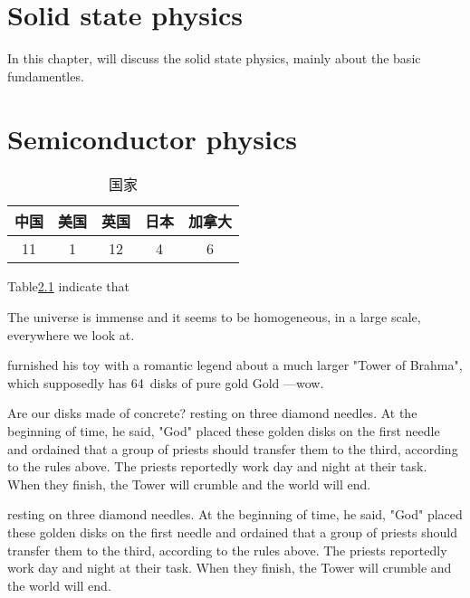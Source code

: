 \chapter{Solid state physics}
\label{Solid state physics}
In this chapter, will discuss the solid state physics, mainly about the basic fundamentles.


\chapter{Semiconductor physics}
\label{Semiconductor physics}

	\begin{table}[H]
		\centering
		\caption{国家}
		\begin{tabular}{|c|c|c|c|c|}
			\hline
			中国 &美国 &英国 &日本&加拿大\\
			\hline
			11&1&12&4&6\\
			\hline
		\end{tabular}
		\label{tab2}    
	\end{table}
	
	Table\ref{tab2} indicate that
	
	The universe is immense and it seems to be homogeneous, 
	in a large scale, everywhere we look at.
	
	furnished his toy with a romantic legend about a much larger
	"Tower of Brahma", which supposedly has 64~disks of pure gold
	Gold ---wow.\par Are our disks made of concrete? 
	resting on three diamond needles. At the beginning of time, he said,
	"God" placed these golden disks on the first needle and ordained that a
	group of priests should transfer them to the third, according to the
	rules above. The priests reportedly work day and night at their task.
	When they finish, the Tower will crumble and the world will end.
	
	resting on three diamond needles. At the beginning of time, he said,
	"God" placed these golden disks on the first needle and ordained that a
	group of priests should transfer them to the third, according to the
	rules above. The priests reportedly work day and night at their task.
	When they finish, the Tower will crumble and the world will end.